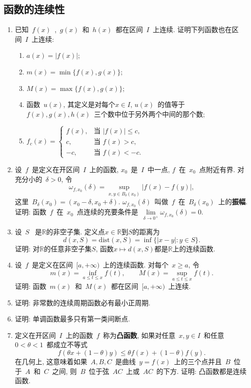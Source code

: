 \documentclass[UTF8,a4paper,20pt]{article}
\begin{document}
\clearpage
\subsection{函数的连续性}
\begin{enumerate}[1.]
\item 已知~$f(x)$~,~$g(x)$~和~$h(x)$~都在区间~$I$~上连续. 证明下列函数也在区间~$I$~上连续:
	\begin{enumerate}[(1)]
	\item $a(x)=|f(x)|$;
	\item $m(x)=\min\{f(x),g(x)\}$;
	\item $M(x)=\max\{f(x),g(x)\}$;
	\item 函数~$u(x)$, 其定义是对每个$x\in I$, $u(x)$~的值等于~$f(x),g(x),h(x)$~三个数中位于另外两个中间的那个数;
	\item $f_c(x)=\begin{cases} f(x), &\text{当~$|f(x)|\leqslant c$,}\\ c, &\text{当~$f(x)>c$,}\\ -c, &\text{当~$f(x)<-c$.}\end{cases}$
	\end{enumerate}

\item 设~$f$~是定义在开区间~$I$~上的函数, $x_0$~是~$I$~中一点, $f$~在~$x_0$~点附近有界. 对充分小的~$\delta>0$, 令
\[ \omega_{f,x_0}(\delta)=\sup_{x,y\in B_{\delta}(x_0)}|f(x)-f(y)|,\]
这里~$B_{\delta}(x_0)=(x_0-\delta,x_0+\delta)$. $\omega_{f,x_0}(\delta)$~叫做~$f$~在~$B_{\delta}(x_0)$~上的{\bf 振幅}. 证明: 函数~$f$~在~$x_0$~点连续的充要条件是~$\lim\limits_{\delta\to0^+}\omega_{f,x_0}(\delta)=0$.

\item 设~$S$~ 是$\mathbb{R}$的非空子集. 定义点$x\in\mathbb{R}$到$S$的距离为
\[ d(x,S)=\mathrm{dist}(x,S)=\inf\{|x-y|:y\in S\}.\]
证明: 对$\mathbb{R}$的任意非空子集$S$, 函数$x\mapsto d(x,S)$都是$\mathbb{R}$上的连续函数.

\item 设~$f$~是定义在区间~$[a,+\infty)$~上的连续函数. 对每个~$x\geqslant a$, 令
\[ m(x)=\inf_{a\leqslant t\leqslant x}{f(t)}, \qquad M(x)=\sup_{a\leqslant t\leqslant x}{f(t)}.\]
证明: 函数~$m(x)$~和~$M(x)$~都在区间~$[a,+\infty)$~上连续.

\item 证明: 非常数的连续周期函数必有最小正周期.

\item 证明: 单调函数最多只有第一类间断点.

\item 定义在开区间~$I$~上的函数~$f$~称为{\bf 凸函数}, 如果对任意~$x,y\in I$~和任意~$0<\theta<1$~都成立不等式
\[ f(\theta x+(1-\theta)y)\leqslant \theta f(x)+(1-\theta)f(y).\]
 在几何上, 这意味着如果~$A,B,C$~是曲线~$y=f(x)$~上的三个点并且~$B$~位于~$A$~和~$C$~之间, 则~$B$~位于弦~$AC$~上或~$AC$~的下方. 证明: 凸函数都是连续函数. 


\end{enumerate}
\end{document}

